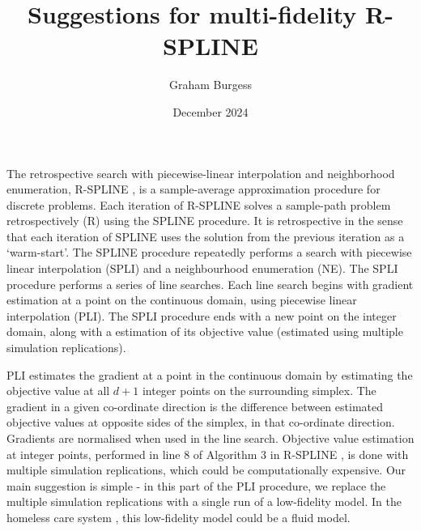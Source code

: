 \documentclass[12pt,a4paper]{article}
\title{Suggestions for multi-fidelity R-SPLINE}
\author{Graham Burgess}
\date{December 2024}
\begin{document}
%
\maketitle

The retrospective search with piecewise-linear interpolation and neighborhood enumeration, R-SPLINE \citep{wang2013integer}, is a sample-average approximation procedure for discrete problems. Each iteration of R-SPLINE solves a sample-path problem retrospectively (R) using the SPLINE procedure. It is retrospective in the sense that each iteration of SPLINE uses the solution from the previous iteration as a `warm-start'. The SPLINE procedure repeatedly performs a search with piecewise linear interpolation (SPLI) and a neighbourhood enumeration (NE). The SPLI procedure performs a series of line searches. Each line search begins with gradient estimation at a point on the continuous domain, using piecewise linear interpolation (PLI). The SPLI procedure ends with a new point on the integer domain, along with a estimation of its objective value (estimated using multiple simulation replications). 

PLI estimates the gradient at a point in the continuous domain by estimating the objective value at all $d + 1$ integer points on the surrounding simplex. The gradient in a given co-ordinate direction is the difference between estimated objective values at opposite sides of the simplex, in that co-ordinate direction. Gradients are normalised when used in the line search. Objective value estimation at integer points, performed in line 8 of Algorithm 3 in R-SPLINE \citep{wang2013integer}, is done with multiple simulation replications, which could be computationally expensive. Our main suggestion is simple - in this part of the PLI procedure, we replace the multiple simulation replications with a single run of a low-fidelity model. In the homeless care system \citep{burgess2024time}, this low-fidelity model could be a fluid model.
\end{document}
